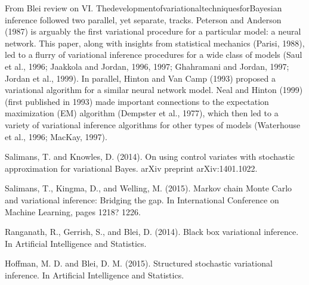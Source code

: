 \documentclass{article}
\begin{document}
From Blei review on VI.
ThedevelopmentofvariationaltechniquesforBayesian inference followed two parallel, yet separate, tracks. Peterson and Anderson (1987) is arguably the first variational procedure for a particular model: a neural network. This paper, along with insights from statistical mechanics (Parisi, 1988), led to a flurry of variational inference procedures for a wide class of models (Saul et al., 1996; Jaakkola and Jordan, 1996, 1997; Ghahramani and Jordan, 1997; Jordan et al., 1999). In parallel, Hinton and Van Camp (1993) proposed a variational algorithm for a similar neural network model. Neal and Hinton (1999) (first published in 1993) made important connections to the expectation maximization (EM) algorithm (Dempster et al., 1977), which then led to a variety of variational inference algorithms for other types of models (Waterhouse et al., 1996; MacKay, 1997).

Salimans, T. and Knowles, D. (2014). On using control variates with stochastic approximation for variational Bayes. arXiv preprint arXiv:1401.1022.

Salimans, T., Kingma, D., and Welling, M. (2015). Markov chain Monte Carlo and variational inference: Bridging the gap. In International Conference on Machine Learning, pages 1218? 1226.

Ranganath, R., Gerrish, S., and Blei, D. (2014). Black box variational inference. In Artificial Intelligence and Statistics.

Hoffman, M. D. and Blei, D. M. (2015). Structured stochastic variational inference. In Artificial Intelligence and Statistics.
\end{document}
